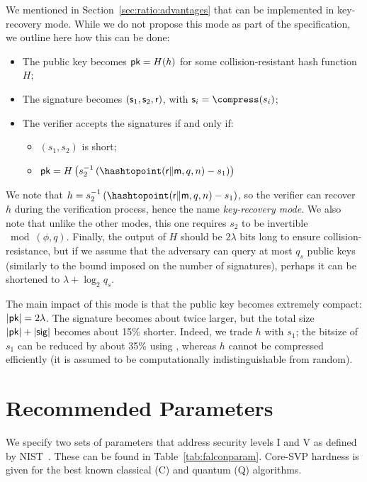 We mentioned in Section~\ref{sec:ratio:advantages} that \falcon can be implemented in key-recovery mode. While we do not propose this mode as part of the specification, we outline here how this can be done:
\begin{itemize}
	\item The public key becomes $\textsf{pk} = H(h)$ for some collision-resistant hash function $H$;
	\item The signature becomes $(\textsf{s}_1, \textsf{s}_2, \textsf{r})$, with $\comps_i = \compress(s_i)$;
	\item The verifier accepts the signatures if and only if:
	\begin{itemize}[noitemsep]
		\item $(s_1, s_2)$ is short;
		\item $ \pk = H \left(s_2^{-1} \left( \hashtopoint(\salt\|\msg, q, n) - s_1 \right) \right)$
	\end{itemize}
\end{itemize}
We note that $h = s_2^{-1} \left( \hashtopoint(\salt\|\msg, q, n) - s_1 \right)$, so the verifier can recover $h$ during the verification process, hence the name \textit{key-recovery mode}.
We also note that unlike the other modes, this one requires $s_2$ to be invertible $\bmod (\phi, q)$. Finally, the output of $H$ should be $2 \lambda$ bits long to ensure collision-resistance, but if we assume that the adversary can query at most $q_s$ public keys (similarly to the bound imposed on the number of signatures), perhaps it can be shortened to $\lambda + \log_2 q_s$.

The main impact of this mode is that the public key becomes extremely compact: $|\textsf{pk}| = 2 \lambda$. The signature becomes about twice larger, but the total size $|\textsf{pk}| + |\textsf{sig}|$ becomes about 15\% shorter. Indeed, we trade $h$ with $s_1$; the bitsize of $s_1$ can be reduced by about 35\% using \compress, whereas $h$ cannot be compressed efficiently (it is assumed to be computationally indistinguishable from random).


\section{Recommended Parameters} \label{sec:spec:params}

We specify two sets of parameters that address security levels I and V as defined by NIST~\cite[Section 4.A.5]{NIST}. These can be found in Table~\ref{tab:falconparam}. Core-SVP hardness is given for the best known classical (C) and quantum (Q) algorithms. 

